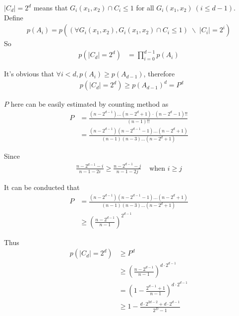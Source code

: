 \documentclass[10pt, conference, compsocconf]{IEEEtran}
\begin{document}
        \begin{IEEEproof}
            $|C_d| = 2^d$ means that $G_i(x_1, x_2) \cap C_i \leq 1$
            for all $G_i(x_1, x_2)~(i \leq d-1)$. Define
            \begin{align*}
                p(A_i) = p\left((\forall G_i(x_1, x_2), G_i(x_1, x_2) \cap C_i \leq 1)
                     \; \backslash \; |C_i| = 2^i\right)
            \end{align*}
            So
            \begin{align*}
                p(|C_d| = 2^d) &= \prod_{i=0}^{d-1} p(A_i)
            \end{align*}

            It's obvious that $\forall i < d, p(A_i) \geq p(A_{d-1})$, therefore
            \begin{align*}
                &p(|C_d| = 2^d)
                \geq p(A_{d-1})^d
                = P^d
            \end{align*}

            $P$ here can be easily estimated by counting method as
            \begin{align*}
                P &= \frac{(n-2^{d-1})\ldots(n-2^d+1)\cdot (n-2^d-1)!!}{(n-1)!!}\\
                    &= \frac{(n-2^{d-1})(n-2^{d-1}-1)\ldots (n-2^d+1)}{(n-1)(n-3)\ldots(n-2^d+1)}
            \end{align*}

            Since
            \begin{align*}
                \frac{n-2^{d-1}-i}{n-1-2i} \geq \frac{n-2^{d-1}-j}{n-1-2j} & \text{ when } i \geq j
            \end{align*}

            It can be conducted that
            \begin{align*}
                P &= \frac{(n-2^{d-1})(n-2^{d-1}-1)\ldots (n-2^d+1)}{(n-1)(n-3)\ldots(n-2^d+1)}\\
                    &\geq (\frac{n-2^{d-1}}{n-1})^{2^{d-1}}
            \end{align*}

            Thus
            \begin{align*}
            p(|C_d| = 2^d) &\geq P^d\\
                &\geq (\frac{n-2^{d-1}}{n-1})^{d \cdot 2^{d-1}}\\
                &= (1-\frac{2^{d-1}+1}{n-1})^{d \cdot 2^{d-1}}\\
                &\geq 1-\frac{d \cdot 2^{2d-2}+d \cdot 2^{d-1}}{2^D-1}
            \end{align*}
        \end{IEEEproof}
\end{document}
